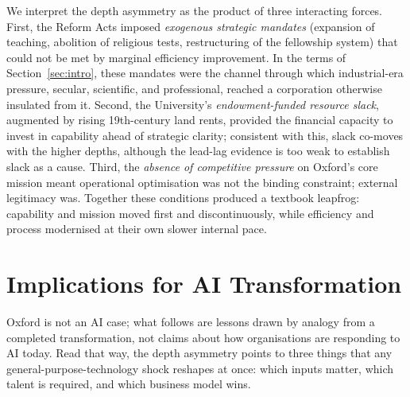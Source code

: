 \documentclass[11pt]{article}
\begin{document}
We interpret the depth asymmetry as the product of three interacting forces. First, the Reform
Acts imposed \emph{exogenous strategic mandates} (expansion of teaching, abolition of
religious tests, restructuring of the fellowship system) that could not be met by marginal
efficiency improvement. In the terms of Section~\ref{sec:intro}, these mandates were the channel
through which industrial-era pressure, secular, scientific, and professional, reached a
corporation otherwise insulated from it. Second, the University's \emph{endowment-funded resource slack},
augmented by rising 19th-century land rents, provided the financial capacity to invest in
capability ahead of strategic clarity; consistent with this, slack co-moves with the higher
depths, although the lead-lag evidence is too weak to establish slack as a cause. Third, the
\emph{absence of competitive pressure} on Oxford's core mission meant operational optimisation
was not the binding constraint; external legitimacy was. Together these conditions produced a
textbook leapfrog: capability and mission moved first and discontinuously, while efficiency and
process modernised at their own slower internal pace.

\section{Implications for AI Transformation}
\label{sec:ai}

Oxford is not an AI case; what follows are lessons drawn by analogy from a completed
transformation, not claims about how organisations are responding to AI today. Read that way, the
depth asymmetry points to three things that any general-purpose-technology shock reshapes at once:
which inputs matter, which talent is required, and which business model wins.
\end{document}
